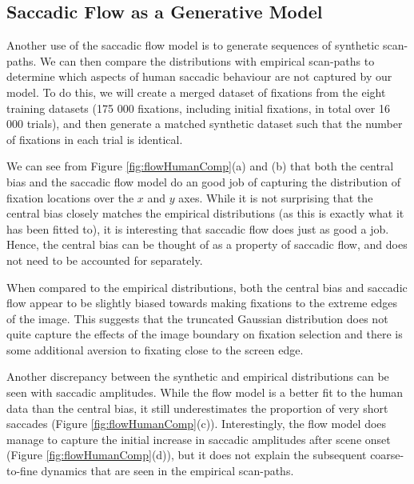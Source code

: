 \documentclass[a4paper, twocolumn, oneside, 10pt]{article}
\begin{document}
\subsection{Saccadic Flow as a Generative Model}
\label{sec:humanComp}

Another use of the saccadic flow model is to generate sequences of synthetic scan-paths. We can then compare the distributions with empirical scan-paths to determine which aspects of human saccadic behaviour are not captured by our model. To do this, we will create a merged dataset of fixations from the eight training datasets (175 000 fixations, including initial fixations, in total over 16 000 trials), and then generate a matched synthetic dataset such that the number of fixations in each trial is identical. 

We can see from Figure \ref{fig:flowHumanComp}(a) and (b) that both the central bias and the saccadic flow model do an good job of capturing the distribution of fixation locations over the $x$ and $y$ axes. While it is not surprising that the central bias closely matches the empirical distributions (as this is exactly what it has been fitted to), it is interesting that saccadic flow does just as good a job. Hence, the central bias can be thought of as a property of saccadic flow, and does not need to be accounted for separately. 

When compared to the empirical distributions, both the central bias and saccadic flow appear to be slightly biased towards making fixations to the extreme edges of the image. This suggests that the truncated Gaussian distribution does not quite capture the effects of the image boundary on fixation selection and there is some additional aversion to fixating close to the screen edge. 

Another discrepancy between the synthetic and empirical distributions can be seen with saccadic amplitudes. While the flow model is a better fit to the human data than the central bias, it still underestimates the proportion of very short saccades (Figure \ref{fig:flowHumanComp}(c)). Interestingly, the flow model does manage to capture the initial increase in saccadic amplitudes after scene onset (Figure \ref{fig:flowHumanComp}(d)), but it does not explain the subsequent coarse-to-fine dynamics that are seen in the empirical scan-paths. 
\end{document}
